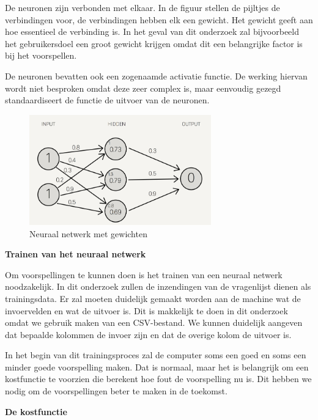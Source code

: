 \vspace{1em}
De neuronen zijn verbonden met elkaar. In de figuur stellen de pijltjes de verbindingen voor, de verbindingen hebben elk een gewicht. Het gewicht geeft aan hoe essentieel de verbinding is. In het geval van dit onderzoek zal bijvoorbeeld het gebruikersdoel een groot gewicht krijgen omdat dit een belangrijke factor is bij het voorspellen. 

De neuronen bevatten ook een zogenaamde activatie functie. De werking hiervan wordt niet besproken omdat deze zeer complex is, maar eenvoudig gezegd standaardiseert de functie de uitvoer van de neuronen. 

\vspace{2em}
\begin{figure}[h!]
\centering
\includegraphics[width=0.7\textwidth]{bachproef/img/gewichten_netwerk.png}
\caption{Neuraal netwerk met gewichten \autocite{cosmosmagazine.com}}
\end{figure}

\newpage

\textbf{Trainen van het neuraal netwerk}

Om voorspellingen te kunnen doen is het trainen van een neuraal netwerk noodzakelijk. In dit onderzoek zullen de inzendingen van de vragenlijst dienen als trainingsdata. Er zal moeten duidelijk gemaakt worden aan de machine wat de invoervelden en wat de uitvoer is. Dit is makkelijk te doen in dit onderzoek omdat we gebruik maken van een CSV-bestand. We kunnen duidelijk aangeven dat bepaalde kolommen de invoer zijn en dat de overige kolom de uitvoer is.

In het begin van dit trainingsproces zal de computer soms een goed en soms een minder goede voorspelling maken. Dat is normaal, maar het is belangrijk om een kostfunctie te voorzien die berekent hoe fout de voorspelling nu is. Dit hebben we nodig om de voorspellingen beter te maken in de toekomst.

\textbf{De kostfunctie}


